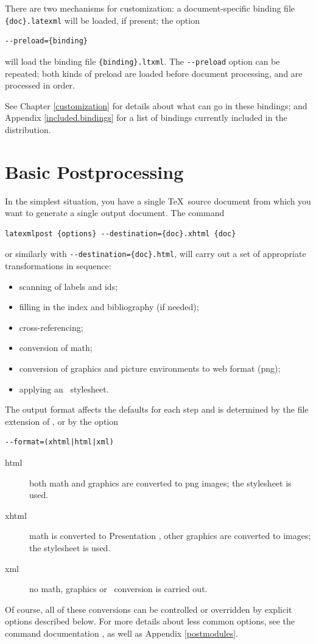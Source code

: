 \documentclass{book}
\newcommand{\shellcode}{\lstinline[style=shell]}
\begin{document}
There are two mechanisms for customization:
a document-specific binding file \shellcode|{doc}.latexml| will
be loaded, if present;
the option
\begin{lstlisting}[style=shell]
--preload={binding}
\end{lstlisting}
will load the binding file \shellcode|{binding}.ltxml|.
The \shellcode|--preload| option can be repeated;
both kinds of preload are loaded before document processing,
and are processed in order.

See Chapter \ref{customization} for details about what can go in these bindings;
and Appendix \ref{included.bindings} for a list of bindings currently
included in the distribution.


\section[Postprocessing]{Basic Postprocessing}\label{usage.single}
In the simplest situation, you have a single \TeX\ source document
from which you want to generate a single output document.
The command
\begin{lstlisting}[style=shell]
latexmlpost {options} --destination={doc}.xhtml {doc}
\end{lstlisting}
or similarly with \shellcode|--destination={doc}.html|,
will carry out a set of appropriate transformations in sequence:
\begin{itemize}
  \item scanning of labels and ids;
  \item filling in the index and bibliography (if needed);
  \item cross-referencing;
  \item conversion of math;
  \item conversion of graphics and picture environments to web format (png);
  \item applying an \XSLT\ stylesheet.
\end{itemize}
The output format affects the defaults for each step and is determined
by the file extension of , or by the option
\begin{lstlisting}[style=shell]
--format=(xhtml|html|xml)
\end{lstlisting}
\begin{description}
 \item[html] both math and graphics are converted to png images;
    the stylesheet  is used.
 \item[xhtml] math is converted to Presentation \MathML, other graphics are converted to images;
    the stylesheet   is used.
 \item[xml] no math, graphics or \XSLT\ conversion is carried out.
\end{description}
Of course, all of these conversions can be controlled or overridden
by explicit options described below.
For more details about less common options, see the command
documentation , as well as Appendix \ref{postmodules}.
\end{document}
